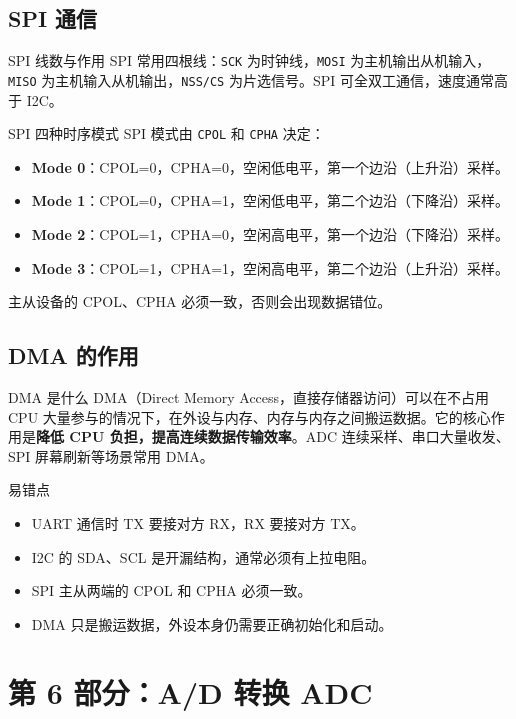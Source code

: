 \documentclass[UTF8,fontset=none,12pt]{ctexart}
\newcommand{\api}[1]{{\footnotesize\nolinkurl{#1}}}
\begin{document}
\subsection{SPI 通信}
\begin{pointbox}{SPI 线数与作用}
SPI 常用四根线：\api{SCK} 为时钟线，\api{MOSI} 为主机输出从机输入，\api{MISO} 为主机输入从机输出，\api{NSS/CS} 为片选信号。SPI 可全双工通信，速度通常高于 I2C。
\end{pointbox}

\begin{pointbox}{SPI 四种时序模式}
SPI 模式由 \api{CPOL} 和 \api{CPHA} 决定：
\begin{itemize}
  \item \textbf{Mode 0}：CPOL=0，CPHA=0，空闲低电平，第一个边沿（上升沿）采样。
  \item \textbf{Mode 1}：CPOL=0，CPHA=1，空闲低电平，第二个边沿（下降沿）采样。
  \item \textbf{Mode 2}：CPOL=1，CPHA=0，空闲高电平，第一个边沿（下降沿）采样。
  \item \textbf{Mode 3}：CPOL=1，CPHA=1，空闲高电平，第二个边沿（上升沿）采样。
\end{itemize}
主从设备的 CPOL、CPHA 必须一致，否则会出现数据错位。
\end{pointbox}

\subsection{DMA 的作用}
\begin{pointbox}{DMA 是什么}
DMA（Direct Memory Access，直接存储器访问）可以在不占用 CPU 大量参与的情况下，在外设与内存、内存与内存之间搬运数据。它的核心作用是\textbf{降低 CPU 负担，提高连续数据传输效率}。ADC 连续采样、串口大量收发、SPI 屏幕刷新等场景常用 DMA。
\end{pointbox}

\begin{warnbox}{易错点}
\begin{itemize}
  \item UART 通信时 TX 要接对方 RX，RX 要接对方 TX。
  \item I2C 的 SDA、SCL 是开漏结构，通常必须有上拉电阻。
  \item SPI 主从两端的 CPOL 和 CPHA 必须一致。
  \item DMA 只是搬运数据，外设本身仍需要正确初始化和启动。
\end{itemize}
\end{warnbox}

\section{第 6 部分：A/D 转换 ADC}
\end{document}
